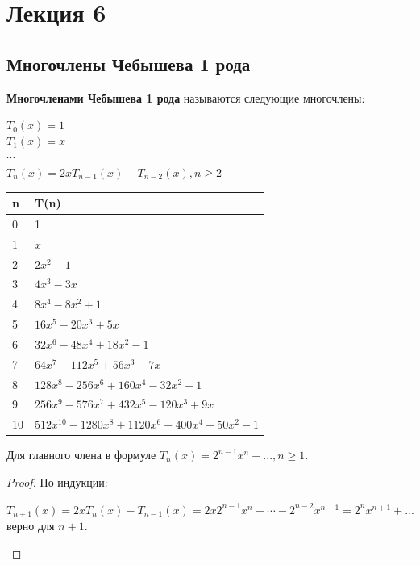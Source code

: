 
\newpage
\section{Лекция 6}
\subsection{Многочлены Чебышева 1 рода}
\begin{definition}\textbf{Многочленами Чебышева 1 рода}  называются следующие многочлены:
\begin{center}
    $T_0(x) = 1$ \\
    $T_1(x) = x$\\
    $\cdots$\\
    $T_n(x) = 2xT_{n-1}(x)-T_{n-2}(x), n\geqslant 2$
\end{center} 
\begin{center}
    \begin{tabular}{|l|l|}
        \hline
        \textbf{n} & \textbf{T(n)} \\ \hline
        0 & 1 \\ \hline
        1 & $x$ \\ \hline
        2 & $2x^2-1$ \\ \hline
        3 & $4x^3-3x$ \\ \hline
        4 & $8x^4-8x^2+1$ \\ \hline
        5 & $16x^5-20x^3+5x$ \\ \hline
        6 & $32x^6-48x^4+18x^2-1$ \\ \hline
        7 & $64x^7-112x^5+56x^3-7x$ \\ \hline
        8 & $128x^8-256x^6+160x^4-32x^2+1$ \\ \hline
        9 & $256x^9-576x^7+432x^5-120x^3+9x$ \\ \hline
        10 & $512x^{10}-1280x^8+1120x^6-400x^4+50x^2-1$ \\ \hline
    \end{tabular}
\end{center}
\end{definition}
\begin{statement}
Для главного члена в формуле $T_n(x)=2^{n-1}x^n+..., n\geqslant 1$.
\end{statement}
\begin{proof} По индукции:\begin{center}
    $T_{n+1}(x)=2xT_n(x)-T_{n-1}(x)=2x2^{n-1}x^n+\cdots-2^{n-2}x^{n-1}=2^nx^{n+1}+...$ верно для $n+1. $\end{center}
\end{proof}
